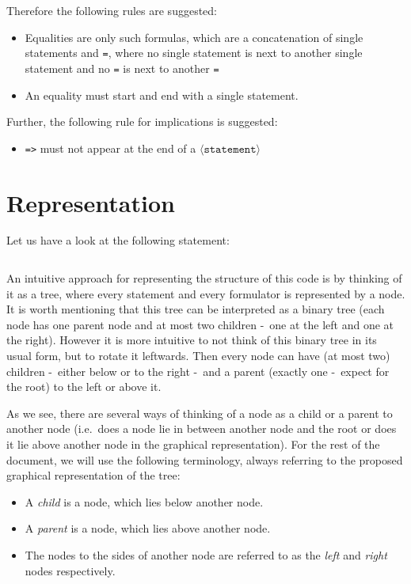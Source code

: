 \documentclass[british]{article}
\newenvironment{code}{\captionsetup{type=listing}}{}
\newcommand\prv{bc}
\newcommand\m[1]{\texttt{#1}}
\begin{document}
Therefore the following rules are suggested:
\begin{itemize}
	\item
		Equalities are only such formulas, which are a concatenation of single
		statements and \m{=}, where no single statement is next to another
		single statement and no \m{=} is next to another \m{=} \checkmark\
	\item
		An equality must start and end with a single statement. \checkmark\
\end{itemize}
\medskip{}

Further, the following rule for implications is suggested:

\begin{itemize}
\item \m{=>} must not appear at the end of a $\langle\texttt{statement}\rangle$
\end{itemize}
\pagebreak{}

\section{Representation}

Let us have a look at the following statement:

\begin{code}
\label{code:ex1}
\inputminted[linenos]{\prv}{examples/exmp1.prove}
\end{code}

An intuitive approach for representing the structure of this code is by thinking
of it as a tree, where every statement and every formulator is represented by a
node. It is worth mentioning that this tree can be interpreted as a binary tree
(each node has one parent node and at most two children -\ one at the left and
one at the right). However it is more intuitive to not think of this binary tree
in its usual form, but to rotate it leftwards. Then every node can have (at most
two) children -\ either below or to the right -\ and a parent (exactly one -\
expect for the root) to the left or above it.

As we see, there are several ways of thinking of a node as a child or a parent
to another node (i.e.\ does a node lie in between another node and the root or
does it lie above another node in the graphical representation). For the rest of
the document, we will use the following terminology, always referring to the
proposed graphical representation of the tree:

\begin{itemize}
	\item
		A \emph{child} is a node, which lies below another node.
	\item
		A \emph{parent} is a node, which lies above another node.
	\item
		The nodes to the sides of another node are referred to as the
		\emph{left} and \emph{right} nodes respectively.
\end{itemize}
\end{document}
